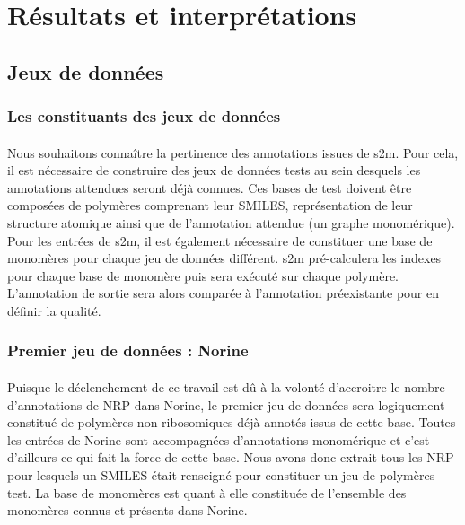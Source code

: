 \documentclass[12pt,french,twoside]{report}
\begin{document}
\section{Résultats et interprétations}

\subsection{Jeux de données}

\subsubsection{Les constituants des jeux de données}

\paragraph{}Nous souhaitons connaître la pertinence des annotations issues de s2m.
Pour cela, il est nécessaire de construire des jeux de données tests au sein desquels les annotations attendues seront déjà connues.
Ces bases de test doivent être composées de polymères comprenant leur SMILES, représentation de leur structure atomique ainsi que de l'annotation attendue (un graphe monomérique).
Pour les entrées de s2m, il est également nécessaire de constituer une base de monomères pour chaque jeu de données différent.
s2m pré-calculera les indexes pour chaque base de monomère puis sera exécuté sur chaque polymère.
L'annotation de sortie sera alors comparée à l'annotation préexistante pour en définir la qualité.


\subsubsection{Premier jeu de données : Norine}

\paragraph{}Puisque le déclenchement de ce travail est dû à la volonté d'accroitre le nombre d'annotations de NRP dans Norine, le premier jeu de données sera logiquement constitué de polymères non ribosomiques déjà annotés issus de cette base.
Toutes les entrées de Norine sont accompagnées d'annotations monomérique et c'est d'ailleurs ce qui fait la force de cette base.
Nous avons donc extrait tous les NRP pour lesquels un SMILES était renseigné pour constituer un jeu de polymères test.
La base de monomères est quant à elle constituée de l'ensemble des monomères connus et présents dans Norine.
\end{document}
